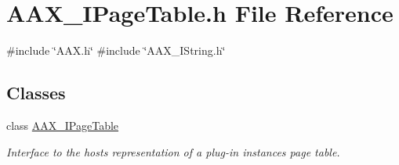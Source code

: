 \hypertarget{a00620}{}\section{A\+A\+X\+\_\+\+I\+Page\+Table.\+h File Reference}
\label{a00620}
{\ttfamily \#include \char`\"{}A\+A\+X.\+h\char`\"{}}\newline
{\ttfamily \#include \char`\"{}A\+A\+X\+\_\+\+I\+String.\+h\char`\"{}}\newline
\subsection*{Classes}
\begin{DoxyCompactItemize}
\item 
class \mbox{\hyperlink{a01849}{A\+A\+X\+\_\+\+I\+Page\+Table}}
\begin{DoxyCompactList}\small\item\em Interface to the host\textquotesingle{}s representation of a plug-\/in instance\textquotesingle{}s page table. \end{DoxyCompactList}\end{DoxyCompactItemize}
